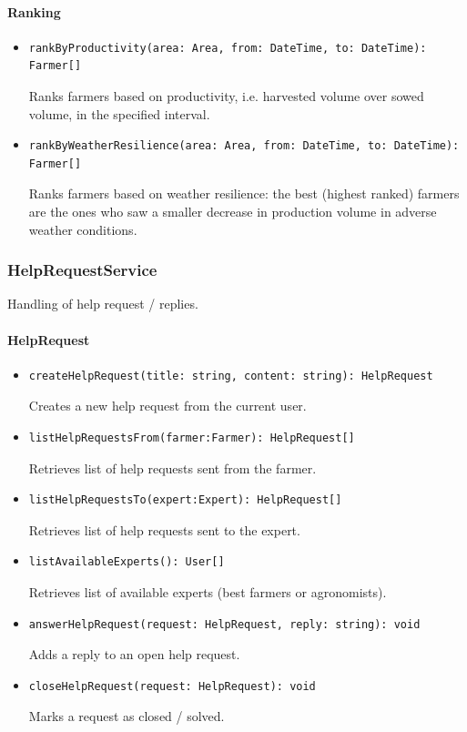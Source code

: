\documentclass{article}
\begin{document}
\paragraph{Ranking}
\begin{itemize}
\item \begin{verbatim}
rankByProductivity(area: Area, from: DateTime, to: DateTime): Farmer[]
\end{verbatim}
Ranks farmers based on productivity, i.e. harvested volume over sowed volume, in the specified interval.
\item \begin{verbatim}
rankByWeatherResilience(area: Area, from: DateTime, to: DateTime): Farmer[]
\end{verbatim}
Ranks farmers based on weather resilience: the best (highest ranked) farmers are the ones who saw a smaller decrease in production volume in adverse weather conditions.
\end{itemize}

\subsubsection{HelpRequestService}
Handling of help request / replies.

\paragraph{HelpRequest}
\begin{itemize}
\item \begin{verbatim}
createHelpRequest(title: string, content: string): HelpRequest
\end{verbatim}
Creates a new help request from the current user.
\item \begin{verbatim}
listHelpRequestsFrom(farmer:Farmer): HelpRequest[]
\end{verbatim}
Retrieves list of help requests sent from the farmer.
\item \begin{verbatim}
listHelpRequestsTo(expert:Expert): HelpRequest[]
\end{verbatim}
Retrieves list of help requests sent to the expert.
\item \begin{verbatim}
listAvailableExperts(): User[]
\end{verbatim}
Retrieves list of available experts (best farmers or agronomists).
\item \begin{verbatim}
answerHelpRequest(request: HelpRequest, reply: string): void
\end{verbatim}
Adds a reply to an open help request.
\item \begin{verbatim}
closeHelpRequest(request: HelpRequest): void
\end{verbatim}
Marks a request as closed / solved.
\end{itemize}
\end{document}
